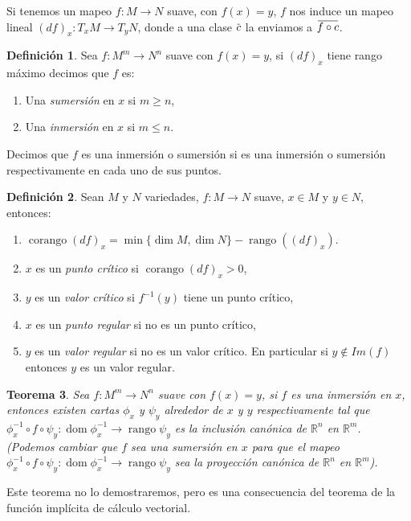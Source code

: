 \documentclass{report}
\newtheorem{theorem}{Teorema}[section]
\theoremstyle{definition}
\newtheorem{defi}[theorem]{Definici\'on}
\DeclareMathOperator{\rango}{rango}
\DeclareMathOperator{\cor}{corango}
\DeclareMathOperator{\dom}{dom}
\newcommand{\overbar}[1]{\mkern 1.5mu\overline{\mkern-1.5mu#1\mkern-1.5mu}\mkern 1.5mu}
\begin{document}
Si tenemos un mapeo $f: M \to N$ suave, con $f(x)=y$, $f$ nos induce un mapeo lineal $(df)_x:T_x M \to T_{y} N$, donde a una clase $\overbar{c}$ la enviamos a $\overbar{f \circ c }$. 

\begin{defi} 
Sea $f:M^m \to N^n$ suave con $f(x) =y$, si $(df)_x$ tiene rango m\'aximo decimos que $f$ es:
\begin{enumerate}
\item Una \textit{sumersi\'on} en $x$ si $m \geq n$,
\item Una \textit{inmersi\'on} en $x$ si $m \leq n$.

\end{enumerate}
\end{defi}
Decimos que $f$ es una inmersi\'on o sumersi\'on si es una inmersi\'on o sumersi\'on respectivamente en cada uno de sus puntos.

\begin{defi}
Sean $M$ y $N$ variedades, $f: M \to N$ suave, $x \in M$ y $y \in N$, entonces:
\begin{enumerate}
\item $\cor (df)_x = \min \{ \dim M, \dim N\} - \rango ((df)_x)$.
\item $x$ es un \textit{punto cr\'itico} si $\cor (df)_x >0$,
\item $y$ es un \textit{valor cr\'itico} si $f^{-1} (y)$ tiene un punto cr\'itico,
\item $x$ es un \textit{punto regular} si no es un punto cr\'itico,
\item $y$ es un \textit{valor regular} si no es un valor cr\'itico. En particular si $y \notin Im(f)$ entonces $y$ es un valor regular.
\end{enumerate}
\end{defi}
\begin{theorem}
Sea $f: M^m \to N^n$ suave con $f(x)=y$, si $f$ es una inmersi\'on en $x$, entonces existen cartas $\phi_x$ y $\psi_y$ alrededor de $x$ y $y$ respectivamente tal que $\phi_x^{-1} \circ f \circ \psi_y: \dom \phi_x^{-1} \to \rango  \psi_y$ es la inclusi\'on can\'onica de $\mathbb{R}^n$ en $\mathbb{R}^m$. (Podemos cambiar que $f$ sea una sumersi\'on en $x$ para que el mapeo $\phi_x^{-1} \circ f \circ \psi_y: \dom \phi_x^{-1} \to \rango  \psi_y$ sea la proyecci\'on can\'onica de $\mathbb{R}^n$ en $\mathbb{R}^m$).
\end{theorem}

Este teorema no lo demostraremos, pero es una consecuencia del teorema de la funci\'on impl\'icita de c\'alculo vectorial. 
\end{document}
